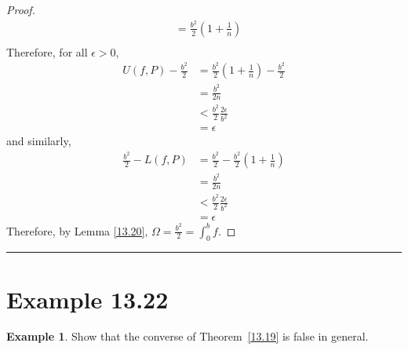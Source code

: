 \documentclass[openany, amssymb, psamsfonts]{amsart}
\theoremstyle{definition}
\newtheorem{exmp}{Example}[section]
\numberwithin{equation}{section}
\begin{document}
\begin{proof}
\begin{align*}
               &= \frac{b^2}{2}(1+ \frac{1}{n})\\
    \end{align*}
    Therefore, for all $\epsilon>0$,  
    \begin{align*}
        U(f,P) - \frac{b^2}{2} &= \frac{b^2}{2}(1+ \frac{1}{n}) - \frac{b^2}{2}\\
        &= \frac{b^2}{2n}\\
        &< \frac{b^2}{2}\frac{2\epsilon}{b^2}\\
        &= \epsilon
    \end{align*}
    and similarly,
    \begin{align*}
        \frac{b^2}{2} - L(f,P) &= \frac{b^2}{2}  - \frac{b^2}{2}(1+ \frac{1}{n})\\
        &= \frac{b^2}{2n}\\
        &< \frac{b^2}{2}\frac{2\epsilon}{b^2}\\
        &= \epsilon 
    \end{align*}
    Therefore, by Lemma \ref{13.20}, $\Omega = \frac{b^2}{2} = \int_0^bf.$
\end{proof}\vspace{4pt}     \hrule   \vspace{4pt}

\section*{Example 13.22}
\begin{exmp} 
\label{13.22}
	Show that the converse of Theorem~\ref{13.19} is false in general.
\end{exmp}
\end{document}
